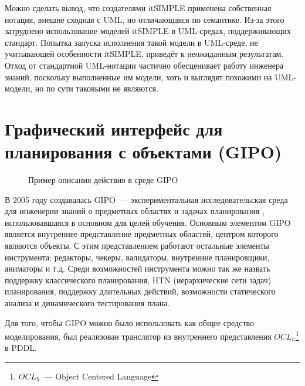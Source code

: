 Можно сделать вывод, что создателями itSIMPLE применена собственная нотация, внешне сходная с UML, но отличающаяся по семантике. Из-за этого затруднено использование моделей itSIMPLE в UML-средах, поддерживающих стандарт. Попытка запуска исполнения такой модели в UML-среде, не учитывающей особенности itSIMPLE, приведёт к неожиданным результатам. Отход от стандартной UML-нотации частично обесценивает работу инженера знаний, поскольку выполненные им модели, хоть и выглядят похожими на UML-модели, но по сути таковыми не являются.

\section{Графический интерфейс для планирования с объектами (GIPO)}

\begin{figure}[h] 
    \caption{Пример описания действия в среде GIPO}
    \label{img:gipo-transition}
\end{figure}

В 2005 году создавалась GIPO~--- экспериментальная исследовательская среда для инженерии знаний о предметных областях и задачах планирования \cite{gipo}, использовавшаяся в основном для целей обучения.
Основным элементом GIPO является внутреннее представление предметных областей, центром которого являются объекты.
С этим представлением работают остальные элементы инструмента: редакторы, чекеры, валидаторы, внутренние планировщики, аниматоры и т.д. 
Среди возможностей инструмента можно так же назвать поддержку классического планирования, HTN (иерархические  сети задач) планирования, поддержку длительных действий, возможности статического анализа и динамического тестирования плана.

Для того, чтобы GIPO можно было использовать как общее средство моделирования, был реализован транслятор из внутреннего представления $OCL_h$\footnote{$OCL_h$~--- Object Centered Language} в PDDL. 

